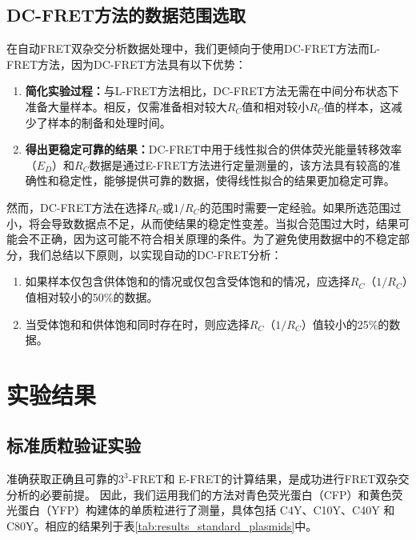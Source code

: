 \subsection{DC-FRET方法的数据范围选取}
\ifshowtext
在自动FRET双杂交分析数据处理中，我们更倾向于使用DC-FRET方法而L-FRET方法，因为DC-FRET方法具有以下优势：
\begin{enumerate}
    \item \textbf{简化实验过程：}与L-FRET方法相比，DC-FRET方法无需在中间分布状态下准备大量样本。相反，仅需准备相对较大$R_C$值和相对较小$R_C$值的样本，这减少了样本的制备和处理时间。
    \item \textbf{得出更稳定可靠的结果：}DC-FRET中用于线性拟合的供体荧光能量转移效率（$E_D$）和$R_C$数据是通过E-FRET方法进行定量测量的，该方法具有较高的准确性和稳定性，能够提供可靠的数据，使得线性拟合的结果更加稳定可靠。
\end{enumerate}

然而，DC-FRET方法在选择$R_C$或$1/R_C$的范围时需要一定经验。如果所选范围过小，将会导致数据点不足，从而使结果的稳定性变差。当拟合范围过大时，结果可能会不正确，因为这可能不符合相关原理的条件。为了避免使用数据中的不稳定部分，我们总结以下原则，以实现自动的DC-FRET分析：
\begin{enumerate}
    \item 如果样本仅包含供体饱和的情况或仅包含受体饱和的情况，应选择$R_C$（$1/R_C$）值相对较小的50\%的数据。
    \item 当受体饱和和供体饱和同时存在时，则应选择$R_C$（$1/R_C$）值较小的25\%的数据。
\end{enumerate}

\fi

\section{实验结果}

\subsection{标准质粒验证实验}
准确获取正确且可靠的$3^3$-FRET和 E-FRET的计算结果，是成功进行FRET双杂交分析的必要前提。
因此，我们运用我们的方法对青色荧光蛋白（CFP）和黄色荧光蛋白（YFP）构建体的单质粒进行了测量，具体包括 C4Y、C10Y、C40Y 和 C80Y。相应的结果列于表\ref{tab:results_standard_plasmids}中。

